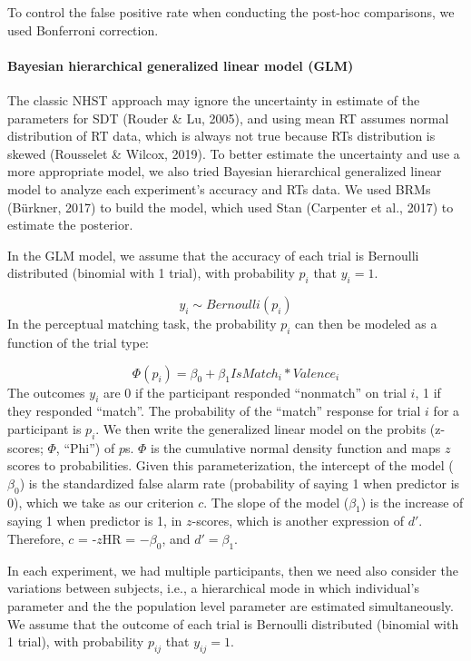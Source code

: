 \documentclass[
  english,
  man]{apa6}
\let\oldparagraph\paragraph
\renewcommand{\paragraph}[1]{\oldparagraph{#1}\mbox{}}
\begin{document}
To control the false positive rate when conducting the post-hoc comparisons, we used Bonferroni correction.

\hypertarget{bayesian-hierarchical-generalized-linear-model-glm}{%
\paragraph{Bayesian hierarchical generalized linear model (GLM)}\label{bayesian-hierarchical-generalized-linear-model-glm}}

The classic NHST approach may ignore the uncertainty in estimate of the parameters for SDT (Rouder \& Lu, 2005), and using mean RT assumes normal distribution of RT data, which is always not true because RTs distribution is skewed (Rousselet \& Wilcox, 2019). To better estimate the uncertainty and use a more appropriate model, we also tried Bayesian hierarchical generalized linear model to analyze each experiment's accuracy and RTs data. We used BRMs (Bürkner, 2017) to build the model, which used Stan (Carpenter et al., 2017) to estimate the posterior.

In the GLM model, we assume that the accuracy of each trial is Bernoulli distributed (binomial with 1 trial), with probability \(p_{i}\) that \(y_{i} = 1\).

\[ y_{i} \sim Bernoulli(p_{i})\]
In the perceptual matching task, the probability \(p_{i}\) can then be modeled as a function of the trial type:

\[ \Phi(p_{i}) =  \beta_{0} + \beta_{1}IsMatch_{i}  * Valence_{i} \]
The outcomes \(y_{i}\) are 0 if the participant responded \enquote{nonmatch} on trial \(i\), 1 if they responded \enquote{match}. The probability of the \enquote{match} response for trial \(i\) for a participant is \(p_{i}\). We then write the generalized linear model on the probits (z-scores; \(\Phi\), \enquote{Phi}) of \(p\)s. \(\Phi\) is the cumulative normal density function and maps \(z\) scores to probabilities. Given this parameterization, the intercept of the model (\(\beta_0\)) is the standardized false alarm rate (probability of saying 1 when predictor is 0), which we take as our criterion \(c\). The slope of the model (\(\beta_1\)) is the increase of saying 1 when predictor is 1, in \(z\)-scores, which is another expression of \(d'\). Therefore, \(c\) = -\(z\)HR = \(-\beta_0\), and \(d' = \beta_1\).

In each experiment, we had multiple participants, then we need also consider the variations between subjects, i.e., a hierarchical mode in which individual's parameter and the the population level parameter are estimated simultaneously. We assume that the outcome of each trial is Bernoulli distributed (binomial with 1 trial), with probability \(p_{ij}\) that \(y_{ij} = 1\).
\end{document}
